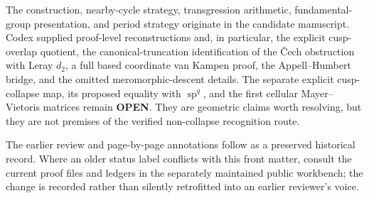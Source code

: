 {\ResultSmall
The construction, nearby-cycle strategy, transgression arithmetic,
fundamental-group presentation, and period strategy originate in the
candidate manuscript.  Codex supplied proof-level reconstructions and, in
particular, the explicit cusp-overlap quotient, the canonical-truncation
identification of the \v{C}ech obstruction with Leray $d_2$, a full based
coordinate van Kampen proof, the Appell--Humbert bridge, and the omitted
meromorphic-descent details.  The separate explicit cusp-collapse map,
its proposed equality with $\operatorname{sp}^q$, and the first cellular
Mayer--Vietoris matrices remain \textbf{OPEN}.  They are geometric claims
worth resolving, but they are not premises of the verified non-collapse
recognition route.
}

\vfill
{\fontsize{6.65pt}{7.65pt}\selectfont\color{AuditProvenance}
The earlier review and page-by-page annotations follow as a preserved
historical record.  Where an older status label conflicts with this front
matter, consult the current proof files and ledgers in the separately
maintained public workbench; the change is recorded rather than silently
retrofitted into an earlier reviewer's voice.}
\endgroup
